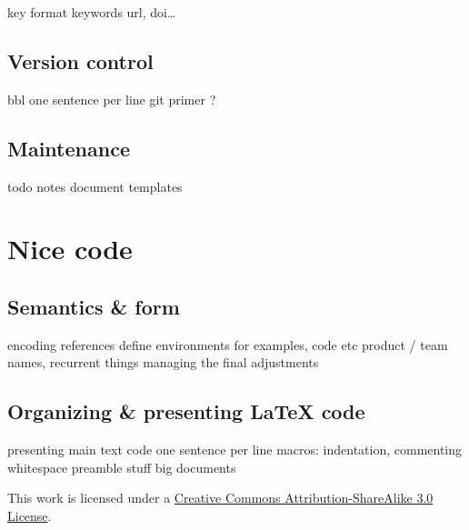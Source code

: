 \documentclass[a4paper,twoside,nofonts]{tufte-handout}
\begin{document}
\begin{todoenv}
    key format
    keywords
    url, doi…
\end{todoenv}

\subsection{Version control} %
\label{sec:vcs}

\begin{todoenv}
    bbl
    one sentence per line
    git primer ?
\end{todoenv}

\subsection{Maintenance} %
\label{sec:maintenance}

\begin{todoenv}
    todo notes
    document templates
\end{todoenv}



\clearpage
\section{Nice code} %
\label{sec:code}

\subsection{Semantics \& form} %
\label{sec:semantics}

\begin{todoenv}
    encoding
    references
    define environments for examples, code etc
    product / team names, recurrent things
    managing the final adjustments
\end{todoenv}

\subsection{Organizing \& presenting \LaTeX{} code} %
\label{sec:format}

\begin{todoenv}
    presenting main text code
    one sentence per line
    macros: indentation, commenting whitespace
    preamble stuff
    big documents
\end{todoenv}



\clearpage

\nocite{*}


\vfill
\begin{fullwidth}\centering
  \ccbysa\quad
  This work is licensed under a \href{http://creativecommons.org/licenses/by-sa/3.0/}{Creative Commons Attribution-ShareAlike 3.0 License}.
\end{fullwidth}
\clearpage\todos
\end{document}
